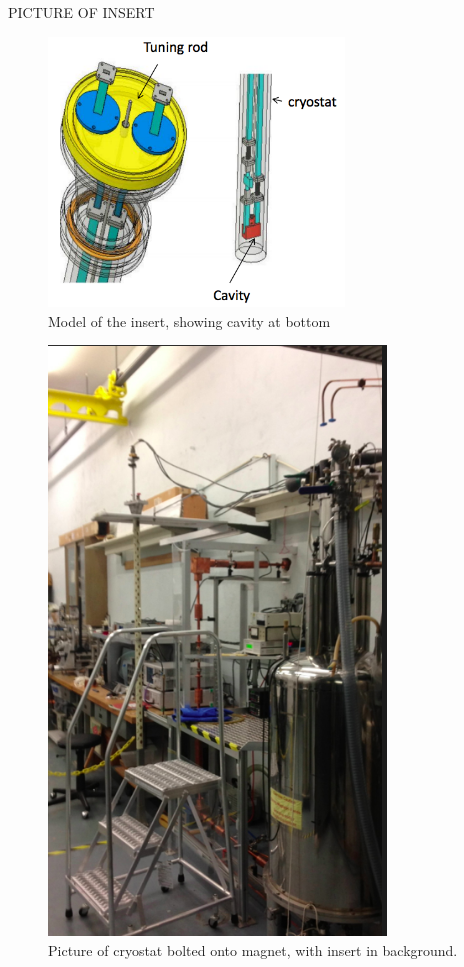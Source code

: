 \documentclass[11pt]{article}
\begin{document}
PICTURE OF INSERT
\begin{figure}
\includegraphics[width=0.7\textwidth]{insertdrawing}
\caption{Model of the insert, showing cavity at bottom}
\end{figure}
\begin{figure}
\includegraphics[width=0.8\textwidth]{experiment}
\caption{Picture of cryostat bolted onto magnet, with insert in background.}
\end{figure}
\end{document}
